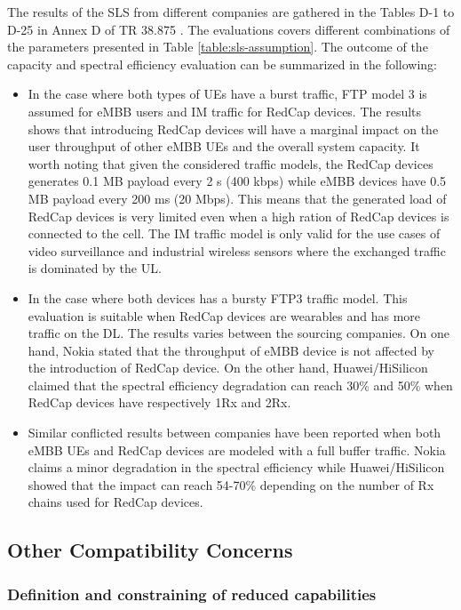 \documentclass[conference]{IEEEtran}
\begin{document}
The results of the SLS from different companies are gathered in the Tables D-1 to D-25 in Annex D of TR 38.875 \cite{3gpp.38.875}. The evaluations covers different combinations of the parameters presented in Table \ref{table:sls-assumption}. The outcome of the capacity and spectral efficiency evaluation can be summarized in the following:

\begin{itemize}
    \item In the case where both types of UEs have a burst traffic, FTP model 3 is assumed for eMBB users and IM traffic for RedCap devices. The results shows that introducing RedCap devices will have a marginal impact on the user throughput of other eMBB UEs and the overall system capacity. It worth noting that given the considered traffic models, the RedCap devices generates 0.1 MB payload every 2 s (400 kbps) while eMBB devices have 0.5 MB payload every 200 ms (20 Mbps). This means that the generated load of RedCap devices is very limited even when a high ration of RedCap devices is connected to the cell. The IM traffic model is only valid for the use cases of video surveillance and industrial wireless sensors where the exchanged traffic is dominated by the UL.
    \item In the case where both devices has a bursty FTP3 traffic model. This evaluation is suitable when RedCap devices are wearables and has more traffic on the DL. The results varies between the sourcing companies. On one hand, Nokia stated that the throughput of eMBB device is not affected by the introduction of RedCap device. On the other hand, Huawei/HiSilicon claimed that the spectral efficiency degradation can reach 30\% and 50\% when RedCap devices have respectively 1Rx and 2Rx.
    \item Similar conflicted results between companies have been reported when both eMBB UEs and RedCap devices are modeled with a full buffer traffic. Nokia claims a minor degradation in the spectral efficiency while Huawei/HiSilicon showed that the impact can reach 54-70\% depending on the number of Rx chains used for RedCap devices.
\end{itemize}





\subsection{Other Compatibility Concerns}
\subsubsection{Definition and constraining of reduced capabilities}
\end{document}
